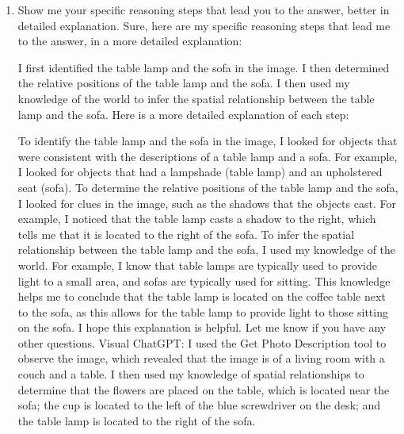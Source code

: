 \begin{enumerate}
    Here are some additional details about the spatial relationship between the table lamp and the sofa:
    
    The table lamp is a small lamp that is typically used to provide light to a small area.
    The sofa is a long, upholstered piece of furniture that is designed for sitting.
    The table lamp is located on a coffee table, which is a small table that is typically placed in front of a sofa.
    Is there anything else I can help you with?
    \subitem Visual ChatGPT: The table lamp is located to the right of the sofa.
    \item Show me your specific reasoning steps that lead you to the answer, better in detailed explanation.
    \subitem 
    Sure, here are my specific reasoning steps that lead me to the answer, in a more detailed explanation:
    
    I first identified the table lamp and the sofa in the image.
    I then determined the relative positions of the table lamp and the sofa.
    I then used my knowledge of the world to infer the spatial relationship between the table lamp and the sofa.
    Here is a more detailed explanation of each step:
    
    To identify the table lamp and the sofa in the image, I looked for objects that were consistent with the descriptions of a table lamp and a sofa. For example, I looked for objects that had a lampshade (table lamp) and an upholstered seat (sofa).
    To determine the relative positions of the table lamp and the sofa, I looked for clues in the image, such as the shadows that the objects cast. For example, I noticed that the table lamp casts a shadow to the right, which tells me that it is located to the right of the sofa.
    To infer the spatial relationship between the table lamp and the sofa, I used my knowledge of the world. For example, I know that table lamps are typically used to provide light to a small area, and sofas are typically used for sitting. This knowledge helps me to conclude that the table lamp is located on the coffee table next to the sofa, as this allows for the table lamp to provide light to those sitting on the sofa.
    I hope this explanation is helpful. Let me know if you have any other questions.
    \subitem Visual ChatGPT: I used the Get Photo Description tool to observe the image, which revealed that the image is of a living room with a couch and a table. I then used my knowledge of spatial relationships to determine that the flowers are placed on the table, which is located near the sofa; the cup is located to the left of the blue screwdriver on the desk; and the table lamp is located to the right of the sofa.
\end{enumerate}

